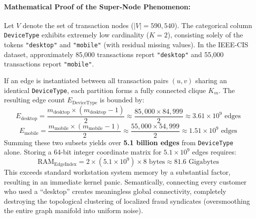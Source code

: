 \documentclass[11pt,a4paper]{article}
\begin{document}
\paragraph{Mathematical Proof of the Super-Node Phenomenon:} Let $V$ denote the set of transaction nodes ($|V| = 590,540$). The categorical column \texttt{DeviceType} exhibits extremely low cardinality ($K=2$), consisting solely of the tokens \texttt{"desktop"} and \texttt{"mobile"} (with residual missing values). In the IEEE-CIS dataset, approximately 85,000 transactions report \texttt{"desktop"} and 55,000 transactions report \texttt{"mobile"}. 

If an edge is instantiated between all transaction pairs $(u, v)$ sharing an identical \texttt{DeviceType}, each partition forms a fully connected clique $K_m$. The resulting edge count $E_{\text{DeviceType}}$ is bounded by:
\begin{equation}
E_{\text{desktop}} = \frac{m_{\text{desktop}} \times (m_{\text{desktop}} - 1)}{2} \approx \frac{85,000 \times 84,999}{2} \approx 3.61 \times 10^9 \text{ edges}
\end{equation}
\begin{equation}
E_{\text{mobile}} = \frac{m_{\text{mobile}} \times (m_{\text{mobile}} - 1)}{2} \approx \frac{55,000 \times 54,999}{2} \approx 1.51 \times 10^9 \text{ edges}
\end{equation}
Summing these two subsets yields over \textbf{5.1 billion edges} from \texttt{DeviceType} alone. Storing a 64-bit integer coordinate matrix for $5.1 \times 10^9$ edges requires:
\begin{equation}
\text{RAM}_{\text{EdgeIndex}} = 2 \times (5.1 \times 10^9) \times 8 \text{ bytes} \approx 81.6 \text{ Gigabytes}
\end{equation}
This exceeds standard workstation system memory by a substantial factor, resulting in an immediate kernel panic. Semantically, connecting every customer who used a ``desktop'' creates meaningless global connectivity, completely destroying the topological clustering of localized fraud syndicates (oversmoothing the entire graph manifold into uniform noise).
\end{document}
